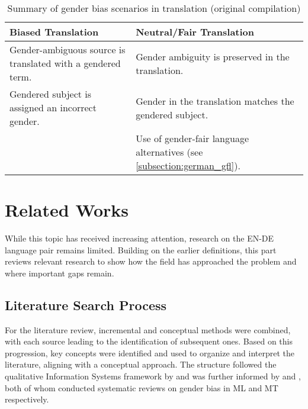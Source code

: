    \begin{table}[htb]
    \centering
    \begin{tabularx}{\linewidth}{X | X}
        \toprule
        \textbf{Biased Translation} & \textbf{Neutral/Fair Translation} \\
        \midrule
        Gender-ambiguous source is translated with a gendered term. & 
        Gender ambiguity is preserved in the translation. \\
        \addlinespace[0.5em]
        Gendered subject is assigned an incorrect gender. & 
        Gender in the translation matches the gendered subject. \\
        \addlinespace[0.5em]
        \multicolumn{1}{c|}{—} & 
        Use of gender-fair language alternatives (see \autoref{subsection:german_gfl}). \\
        \bottomrule
    \end{tabularx}
    \caption[Summary of gender bias scenarios in translation]{Summary of gender bias scenarios in translation (original compilation)}
    \label{tab:overview_bias_neutral}
    \end{table}


\section{Related Works}
While this topic has received increasing attention, research on the EN-DE language pair remains limited. Building on the earlier definitions, this part reviews relevant research to show how the field has approached the problem and where important gaps remain.

    \subsection{Literature Search Process}
        For the literature review, incremental and conceptual methods were combined, with each source leading to the identification of subsequent ones. Based on this progression, key concepts were identified and used to organize and interpret the literature, aligning with a conceptual approach. The structure followed the qualitative Information Systems framework by \textcite{schryenWritingQualitativeLiterature2015} and was further informed by \textcite{shresthaExploringGenderBiases2022} and \textcite{savoldiDecadeGenderBias2025}, both of whom conducted systematic reviews on gender bias in ML and MT respectively.

